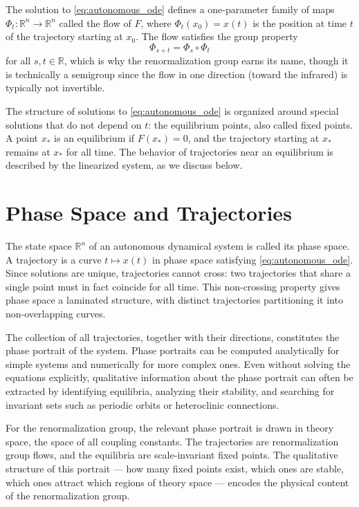 \documentclass[11pt, twoside, openright]{book}
\theoremstyle{dotted}
\theoremstyle{definition}
\begin{document}
The solution to \eqref{eq:autonomous_ode} defines a one-parameter family of maps
$\Phi_t: \mathbb{R}^n \to \mathbb{R}^n$ called the flow of $F$, where $\Phi_t(x_0)
= x(t)$ is the position at time $t$ of the trajectory starting at $x_0$. The flow
satisfies the group property
\begin{equation}
  \Phi_{s+t} = \Phi_s \circ \Phi_t
\end{equation}
for all $s, t \in \mathbb{R}$, which is why the renormalization group earns its
name, though it is technically a semigroup since the flow in one direction
(toward the infrared) is typically not invertible.

The structure of solutions to \eqref{eq:autonomous_ode} is organized around
special solutions that do not depend on $t$: the equilibrium points, also called
fixed points. A point $x_*$ is an equilibrium if $F(x_*) = 0$, and the trajectory
starting at $x_*$ remains at $x_*$ for all time. The behavior of trajectories near
an equilibrium is described by the linearized system, as we discuss below.

\section{Phase Space and Trajectories}

The state space $\mathbb{R}^n$ of an autonomous dynamical system is called its phase
space. A trajectory is a curve $t \mapsto x(t)$ in phase space satisfying
\eqref{eq:autonomous_ode}. Since solutions are unique, trajectories cannot cross:
two trajectories that share a single point must in fact coincide for all time. This
non-crossing property gives phase space a laminated structure, with distinct
trajectories partitioning it into non-overlapping curves.

The collection of all trajectories, together with their directions, constitutes the
phase portrait of the system. Phase portraits can be computed analytically for
simple systems and numerically for more complex ones. Even without solving the
equations explicitly, qualitative information about the phase portrait can often be
extracted by identifying equilibria, analyzing their stability, and searching for
invariant sets such as periodic orbits or heteroclinic connections.

For the renormalization group, the relevant phase portrait is drawn in theory space,
the space of all coupling constants. The trajectories are renormalization group
flows, and the equilibria are scale-invariant fixed points. The qualitative
structure of this portrait --- how many fixed points exist, which ones are stable,
which ones attract which regions of theory space --- encodes the physical content
of the renormalization group.
\end{document}
